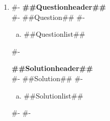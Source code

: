 \documentclass[a4paper]{article}
\begin{document}

\begin{enumerate}
#-
  \item
#-
  \textbf{##Questionheader##}\\
#-
  ##Question##
#-
  \begin{enumerate}[(a)]
    \item ##Questionlist##
  \end{enumerate}
#-

  \textbf{##Solutionheader##}\\
#-
  ##Solution##
#-
  \begin{enumerate}[(a)]
    \item ##Solutionlist##
  \end{enumerate}
#-
#-
\end{enumerate}
\end{document}

